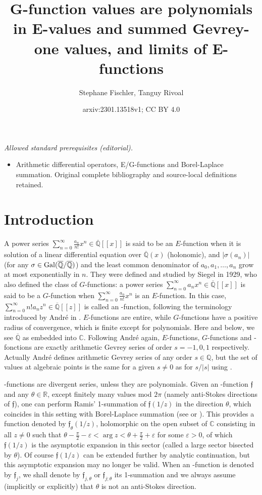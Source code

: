 \documentclass[reqno,12pt]{article}
\title{G-function values are polynomials in E-values and summed Gevrey-one values, and limits of E-functions}
\author{Stephane Fischler, Tanguy Rivoal}
\date{arxiv:2301.13518v1; CC BY 4.0}
\numberwithin{equation}{section}
\theoremstyle{remark}
\newcommand{\Q}{\mathbb{Q}}
\newcommand{\R}{\mathbb{R}}
\providecommand{\C}{}\renewcommand{\C}{\mathbb{C}}
\newcommand{\Qbar}{\overline{\mathbb Q}}
\newcommand{\eps}{\varepsilon}
\newcommand{\tantie}{{\fontencoding{OT2}\fontfamily{wncyr}\selectfont\CYREREV}}
\newcommand{\antie}{\text{\tantie}}
\newcommand{\fgo}{\mathfrak{f}}
\begin{document}
\maketitle
\noindent\textit{Allowed standard prerequisites (editorial).}\begin{itemize}
\item Arithmetic differential operators, E/G-functions and Borel-Laplace summation. Original complete bibliography and source-local definitions retained.
\end{itemize}\medskip
\section{Introduction} \label{sec:intro}





A power series $\sum_{n=0}^\infty \frac{a_n}{n!} x^n \in \Qbar[[x]]$ is said to be an $E$-function when it is solution of a linear differential equation over $\Qbar(x)$ (holonomic), and $\vert \sigma(a_n)\vert$ (for any $\sigma\in \textup{Gal}(\Qbar/\Qbar)$) and the least common denominator of $a_0, a_1, \ldots, a_n$ grow at most exponentially in $n$. They were defined and studied by Siegel in 1929, who also defined the class of $G$-functions: a power series $\sum_{n=0}^\infty a_n x^n \in \Qbar[[x]]$ is said to be a $G$-function when $\sum_{n=0}^\infty \frac{a_n}{n!} x^n$ is an $E$-function. In this case,  $\sum_{n=0}^\infty n!a_n z^n\in \Qbar[[z]]$  is called an \antie-function, following the terminology introduced by Andr\'e in \cite{andre}. $E$-functions are entire, while $G$-functions have a positive radius of convergence, which is finite except for polynomials. Here and below, we see $\Qbar$ as embedded into $\C$. Following André again, $E$-functions, $G$-functions and \tantie-fonctions are exactly arithmetic Gevrey series of  order $s=-1,0,1$ respectively. Actually André defines arithmetic Gevrey series of any order $s\in\Q$, but the set of values at algebraic points is the same for a given $s\neq 0$ as for $s/|s|$ using \cite[Corollaire 1.3.2]{andre}.

{\antie}-functions are divergent series, unless they are polynomials. 
Given an \antie-function $\fgo$ and any $\theta\in\R$, except finitely many values mod $2\pi$ (namely anti-Stokes directions of $\fgo$), one can perform Ramis' 1-summation of $\fgo(1/z)$ in the direction $\theta$, which coincides in this setting with Borel-Laplace summation (see \cite{Ramis} or \cite{ateo}). This provides a function denoted by $\fgo_\theta(1/z)$, holomorphic on the open subset of $\C$ consisting in all $z\neq 0$ such that $\theta-\frac\pi 2 -\eps < \arg z <  \theta+\frac\pi 2 +\eps$ for some $\eps>0$, of which $\fgo(1/z)$ is the asymptotic expansion in this sector (called a large sector bisected by $\theta$). Of course $\fgo(1/z)$ can be extended further by analytic continuation, but this asymptotic expansion may no longer be valid. When an  \antie-function  is denoted by $\fgo_j$, we shall denote by $\fgo_{j,\theta}$ or $\fgo_{j;\theta}$ its 1-summation and we always assume (implicitly or explicitly) that $\theta $ is not an anti-Stokes direction.
\end{document}

